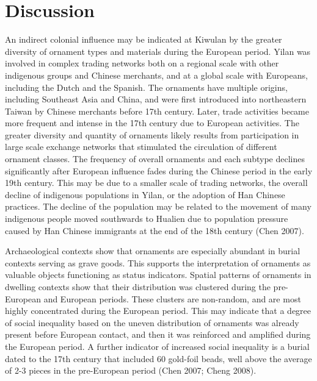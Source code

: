 \documentclass[]{article}
\begin{document}
\hypertarget{discussion}{%
\section{Discussion}\label{discussion}}

An indirect colonial influence may be indicated at Kiwulan by the
greater diversity of ornament types and materials during the European
period. Yilan was involved in complex trading networks both on a
regional scale with other indigenous groups and Chinese merchants, and
at a global scale with Europeans, including the Dutch and the Spanish.
The ornaments have multiple origins, including Southeast Asia and China,
and were first introduced into northeastern Taiwan by Chinese merchants
before 17th century. Later, trade activities became more frequent and
intense in the 17th century due to European activities. The greater
diversity and quantity of ornaments likely results from participation in
large scale exchange networks that stimulated the circulation of
different ornament classes. The frequency of overall ornaments and each
subtype declines significantly after European influence fades during the
Chinese period in the early 19th century. This may be due to a smaller
scale of trading networks, the overall decline of indigenous populations
in Yilan, or the adoption of Han Chinese practices. The decline of the
population may be related to the movement of many indigenous people
moved southwards to Hualien due to population pressure caused by Han
Chinese immigrants at the end of the 18th century (Chen 2007).

Archaeological contexts show that ornaments are especially abundant in
burial contexts serving as grave goods. This supports the interpretation
of ornaments as valuable objects functioning as status indicators.
Spatial patterns of ornaments in dwelling contexts show that their
distribution was clustered during the pre-European and European periods.
These clusters are non-random, and are most highly concentrated during
the European period. This may indicate that a degree of social
inequality based on the uneven distribution of ornaments was already
present before European contact, and then it was reinforced and
amplified during the European period. A further indicator of increased
social inequality is a burial dated to the 17th century that included 60
gold-foil beads, well above the average of 2-3 pieces in the
pre-European period (Chen 2007; Cheng 2008).
\end{document}
